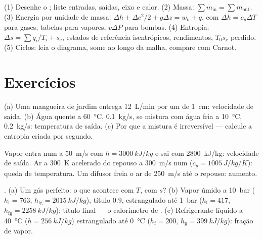 \begin{method}\label{meth:b2:open-systems:method}
(1) Desenhe o ; liste entradas, saídas, eixo e calor.
(2) Massa: $\sum\dot m_{\text{in}} = \sum\dot m_{\text{out}}$. (3) Energia
por unidade de massa: $\Delta h + \Delta c^2/2 + g\Delta z = w_{\text{u}} + q$, com
$\Delta h = c_p\Delta T$ para gases, tabelas para vapores, $v\Delta P$ para
bombas. (4) Entropia: $\Delta s = \sum q_i/T_i + s_{\text{c}}$, estados de
referência isentrópicos, rendimentos, $T_0s_{\text{c}}$ perdido. (5) Ciclos: leia
o diagrama, some ao longo da malha, compare com Carnot.
\end{method}

\section{Exercícios}

\begin{exercise}[$\star$]\label{exo:b2:open-systems:1}
(a) Uma mangueira de jardim entrega \qty{12}{L/min} por um  de \qty{1}{cm}:
velocidade de saída. (b) Água quente a \qty{60}{\celsius}, \qty{0.1}{kg/s},
se mistura com água fria a \qty{10}{\celsius}, \qty{0.2}{kg/s}: temperatura
de saída. (c) Por que a mistura é irreversível --- calcule a
entropia criada por segundo.
\end{exercise}

\begin{exercise}[$\star$]\label{exo:b2:open-systems:2}
Vapor entra num  a \qty{50}{m/s} com $h = \qty{3000}{kJ/kg}$ e
sai com \qty{2800}{kJ/kg}: velocidade de saída. Ar a \qty{300}{K} acelerado
do repouso a \qty{300}{m/s} num  ($c_p = \qty{1005}{J/kg/K}$):
queda de temperatura. Um difusor freia o ar de \qty{250}{m/s} até o repouso: aumento.
\end{exercise}

\begin{exercise}[$\star$]\label{exo:b2:open-systems:3}
. (a) Um gás perfeito: o que acontece com $T$, com $s$? (b) Vapor úmido
a \qty{10}{bar} ($h_{\text{f}} = 763$, $h_{\text{fg}} = \qty{2015}{kJ/kg}$),
título $0.9$, estrangulado até \qty{1}{bar} ($h_{\text{f}} = 417$, $h_{\text{fg}}
= \qty{2258}{kJ/kg}$): título final --- o calorímetro de . (c)
Refrigerante líquido a \qty{40}{\celsius} ($h = \qty{256}{kJ/kg}$) estrangulado
até \qty{0}{\celsius} ($h_{\text{f}} = 200$, $h_{\text{g}} = \qty{399}{kJ/kg}$):
fração de vapor.
\end{exercise}

